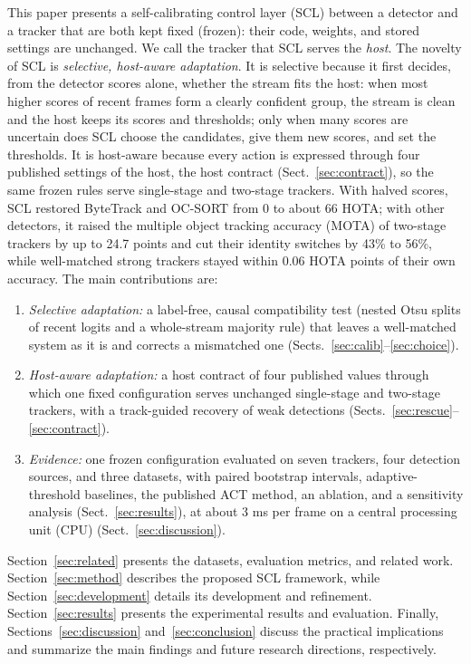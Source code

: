 \documentclass[pdflatex,sn-mathphys-num,iicol]{sn-jnl}
\newcommand{\scl}{SCL}
\begin{document}
This paper presents a self-calibrating control layer (\scl{}) between a detector and a tracker that
are both kept fixed (frozen): their code, weights, and stored settings are unchanged. We call the
tracker that \scl{} serves the \emph{host}. The novelty of \scl{} is \emph{selective, host-aware
adaptation}. It is selective because it first decides, from the detector scores alone, whether the
stream fits the host: when most higher scores of recent frames form a clearly confident group, the
stream is clean and the host keeps its scores and thresholds; only when many scores are uncertain
does \scl{} choose the candidates, give them new scores, and set the thresholds. It is host-aware
because every action is expressed through four published settings of the host, the host contract
(Sect.~\ref{sec:contract}), so the same frozen rules serve single-stage and two-stage trackers.
With halved scores, \scl{} restored ByteTrack and OC-SORT from 0 to about 66 HOTA; with other
detectors, it raised the multiple object tracking accuracy (MOTA) of two-stage trackers by up to
24.7 points and cut their identity switches by 43\% to 56\%, while well-matched strong trackers
stayed within 0.06 HOTA points of their own accuracy. The main contributions are:
\begin{enumerate}
\item \emph{Selective adaptation:} a label-free, causal compatibility test (nested Otsu splits of
      recent logits and a whole-stream majority rule) that leaves a well-matched system as it is
      and corrects a mismatched one (Sects.~\ref{sec:calib}--\ref{sec:choice}).
\item \emph{Host-aware adaptation:} a host contract of four published values through which one
      fixed configuration serves unchanged single-stage and two-stage trackers, with a track-guided
      recovery of weak detections (Sects.~\ref{sec:rescue}--\ref{sec:contract}).
\item \emph{Evidence:} one frozen configuration evaluated on seven trackers, four detection sources,
      and three datasets, with paired bootstrap intervals, adaptive-threshold baselines, the
      published ACT method, an ablation, and a sensitivity analysis (Sect.~\ref{sec:results}), at
      about 3 ms per frame on a central processing unit (CPU) (Sect.~\ref{sec:discussion}).
\end{enumerate}

Section~\ref{sec:related} presents the datasets, evaluation metrics, and related work.
Section~\ref{sec:method} describes the proposed \scl{} framework, while
Section~\ref{sec:development} details its development and refinement. Section~\ref{sec:results}
presents the experimental results and evaluation. Finally, Sections~\ref{sec:discussion}
and~\ref{sec:conclusion} discuss the practical implications and summarize the main findings and
future research directions, respectively.
\end{document}
